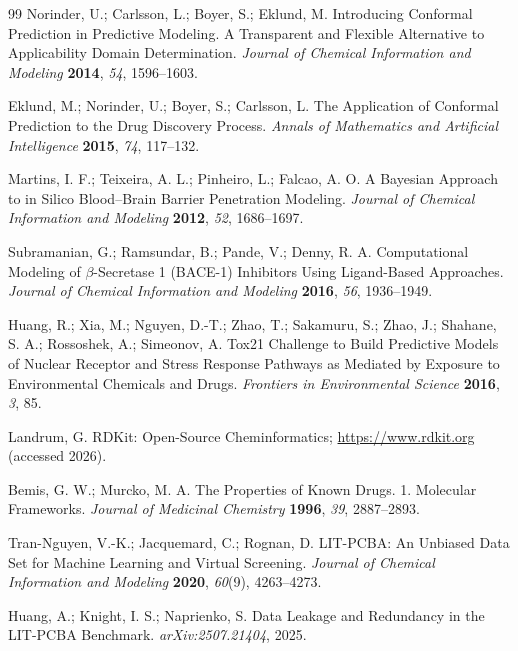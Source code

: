 \documentclass[11pt]{article}
\begin{document}
\begin{thebibliography}{99}
 Norinder, U.; Carlsson, L.; Boyer, S.; Eklund, M. Introducing Conformal
Prediction in Predictive Modeling. A Transparent and Flexible Alternative to Applicability Domain
Determination. \emph{Journal of Chemical Information and Modeling} \textbf{2014}, \emph{54},
1596--1603.

 Eklund, M.; Norinder, U.; Boyer, S.; Carlsson, L. The Application of Conformal
Prediction to the Drug Discovery Process. \emph{Annals of Mathematics and Artificial Intelligence}
\textbf{2015}, \emph{74}, 117--132.

 Martins, I. F.; Teixeira, A. L.; Pinheiro, L.; Falcao, A. O. A Bayesian
Approach to in Silico Blood--Brain Barrier Penetration Modeling. \emph{Journal of Chemical
Information and Modeling} \textbf{2012}, \emph{52}, 1686--1697.

 Subramanian, G.; Ramsundar, B.; Pande, V.; Denny, R. A. Computational
Modeling of $\beta$-Secretase 1 (BACE-1) Inhibitors Using Ligand-Based Approaches. \emph{Journal of
Chemical Information and Modeling} \textbf{2016}, \emph{56}, 1936--1949.

 Huang, R.; Xia, M.; Nguyen, D.-T.; Zhao, T.; Sakamuru, S.; Zhao, J.; Shahane, S.
A.; Rossoshek, A.; Simeonov, A. Tox21 Challenge to Build Predictive Models of Nuclear Receptor and
Stress Response Pathways as Mediated by Exposure to Environmental Chemicals and Drugs.
\emph{Frontiers in Environmental Science} \textbf{2016}, \emph{3}, 85.

 Landrum, G. RDKit: Open-Source Cheminformatics; \url{https://www.rdkit.org}
(accessed 2026).

 Bemis, G. W.; Murcko, M. A. The Properties of Known Drugs. 1. Molecular
Frameworks. \emph{Journal of Medicinal Chemistry} \textbf{1996}, \emph{39}, 2887--2893.

 Tran-Nguyen, V.-K.; Jacquemard, C.; Rognan, D. LIT-PCBA: An Unbiased Data Set
for Machine Learning and Virtual Screening. \emph{Journal of Chemical Information and Modeling}
\textbf{2020}, \emph{60}(9), 4263--4273.

 Huang, A.; Knight, I. S.; Naprienko, S. Data Leakage and Redundancy in the
LIT-PCBA Benchmark. \emph{arXiv:2507.21404}, 2025.

\end{thebibliography}
\end{document}
